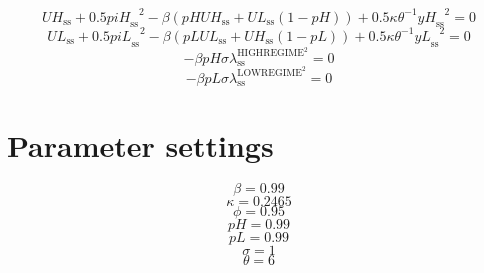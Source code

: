 \begin{equation}
{U\!H}_\mathrm{ss} + 0.5{{p\!i\!H}_\mathrm{ss}}^{2} - {\beta} \left({{p\!H}} {{U\!H}_\mathrm{ss}} + {{U\!L}_\mathrm{ss}} \left(1 - {p\!H}\right)\right) + 0.5{\kappa} {\theta}^{-1} {{y\!H}_\mathrm{ss}}^{2} = 0
\end{equation}
\begin{equation}
{U\!L}_\mathrm{ss} + 0.5{{p\!i\!L}_\mathrm{ss}}^{2} - {\beta} \left({{p\!L}} {{U\!L}_\mathrm{ss}} + {{U\!H}_\mathrm{ss}} \left(1 - {p\!L}\right)\right) + 0.5{\kappa} {\theta}^{-1} {{y\!L}_\mathrm{ss}}^{2} = 0
\end{equation}
\begin{equation}
-{\beta} {{p\!H}} {\sigma} {\lambda^{\mathrm{HIGHREGIME}^{\mathrm{2}}}_\mathrm{ss}} = 0
\end{equation}
\begin{equation}
-{\beta} {{p\!L}} {\sigma} {\lambda^{\mathrm{LOWREGIME}^{\mathrm{2}}}_\mathrm{ss}} = 0
\end{equation}






\section{Parameter settings}

\begin{equation}
\beta = 0.99
\end{equation}
\begin{equation}
\kappa = 0.2465
\end{equation}
\begin{equation}
\phi = 0.95
\end{equation}
\begin{equation}
{p\!H} = 0.99
\end{equation}
\begin{equation}
{p\!L} = 0.99
\end{equation}
\begin{equation}
\sigma = 1
\end{equation}
\begin{equation}
\theta = 6
\end{equation}



